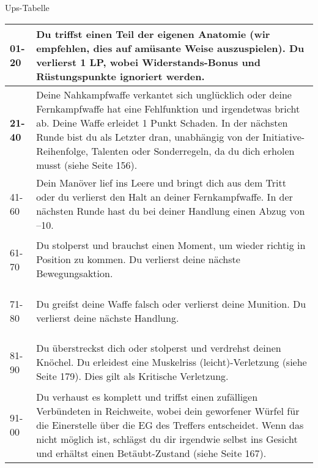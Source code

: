 \documentclass{article}
\begin{document}
\begin{multicols*}{3}
    
    \begin{slsframe}{Ups-Tabelle}        
            \begin{tabularx}{\linewidth}{@{}>{\bfseries}l@{\hspace{.5em}}X@{}}
                01-20 & Du triffst einen Teil der eigenen Anatomie (wir empfehlen, dies auf amüsante Weise auszuspielen). Du verlierst 1 LP, wobei Widerstands-Bonus und Rüstungspunkte ignoriert werden.  \\ \hline

                21-40 & Deine Nahkampfwaffe verkantet sich unglücklich oder deine Fernkampfwaffe hat eine Fehlfunktion und irgendetwas bricht ab. Deine Waffe erleidet 1 Punkt Schaden. In der nächsten Runde bist du als Letzter dran, unabhängig von der Initiative-Reihenfolge, Talenten oder Sonderregeln, da du dich erholen musst (siehe Seite 156).\\ \hline

                41-60 & Dein Manöver lief ins Leere und bringt dich aus dem Tritt oder du verlierst den Halt an deiner Fernkampfwaffe. In der nächsten Runde hast du bei deiner Handlung einen Abzug von –10.\\ \hline

                61-70 & Du stolperst und brauchst einen Moment, um wieder richtig in Position zu kommen. Du verlierst deine nächste Bewegungsaktion.  \\ \hline

                71-80 & Du greifst deine Waffe falsch oder verlierst deine Munition. Du verlierst deine nächste Handlung.  \\ \hline

                81-90 & Du überstreckst dich oder stolperst und verdrehst deinen Knöchel. Du erleidest eine Muskelriss (leicht)-Verletzung (siehe Seite 179). Dies gilt als Kritische Verletzung. \\ \hline

                91-00 & Du verhaust es komplett und triffst einen zufälligen Verbündeten in Reichweite, wobei dein geworfener Würfel für die Einerstelle über die EG des Treffers entscheidet. Wenn das nicht möglich ist, schlägst du dir irgendwie selbst ins Gesicht und erhältst einen Betäubt-Zustand (siehe Seite 167).

            \end{tabularx}        
    \end{slsframe}
    


\end{multicols*}
\end{document}
